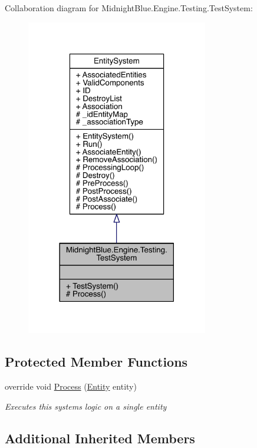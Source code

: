 Collaboration diagram for Midnight\+Blue.\+Engine.\+Testing.\+Test\+System\+:
\nopagebreak
\begin{figure}[H]
\begin{center}
\leavevmode
\includegraphics[width=225pt]{class_midnight_blue_1_1_engine_1_1_testing_1_1_test_system__coll__graph}
\end{center}
\end{figure}
\subsection*{Protected Member Functions}
\begin{DoxyCompactItemize}
\item 
override void \hyperlink{class_midnight_blue_1_1_engine_1_1_testing_1_1_test_system_ac62a56362815c277e8c784246932fab4}{Process} (\hyperlink{class_midnight_blue_1_1_engine_1_1_entity_component_1_1_entity}{Entity} entity)
\begin{DoxyCompactList}\small\item\em Executes this systems logic on a single entity \end{DoxyCompactList}\end{DoxyCompactItemize}
\subsection*{Additional Inherited Members}


